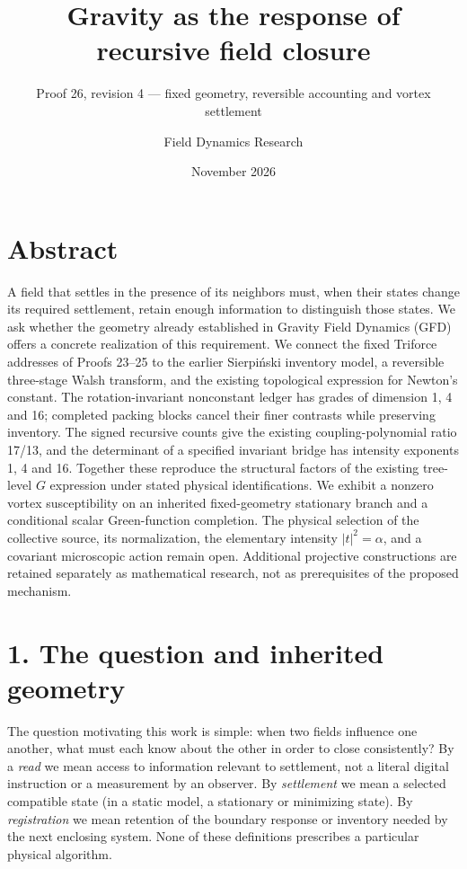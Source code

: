 \documentclass[
  11pt,
]{article}
\title{Gravity as the response of recursive field closure}
\subtitle{Proof 26, revision 4 --- fixed geometry, reversible
accounting and vortex settlement}
\author{Field Dynamics Research}
\date{November 2026}
\begin{document}
\maketitle

\section{Abstract}\label{abstract}

A field that settles in the presence of its neighbors must, when their
states change its required settlement, retain enough information to
distinguish those states. We ask whether the geometry already
established in Gravity Field Dynamics (GFD) offers a concrete
realization of this requirement. We connect the fixed Triforce addresses
of Proofs 23--25 to the earlier Sierpiński inventory model, a reversible
three-stage Walsh transform, and the existing topological expression for
Newton's constant. The rotation-invariant nonconstant ledger has grades
of dimension 1, 4 and 16; completed packing blocks cancel their finer
contrasts while preserving inventory. The signed recursive counts give
the existing coupling-polynomial ratio 17/13, and the determinant of a
specified invariant bridge has intensity exponents 1, 4 and 16. Together
these reproduce the structural factors of the existing tree-level \(G\)
expression under stated physical identifications. We exhibit a nonzero
vortex susceptibility on an inherited fixed-geometry stationary branch
and a conditional scalar Green-function completion. The physical
selection of the collective source, its normalization, the elementary
intensity \(|t|^2=\alpha\), and a covariant microscopic action remain
open. Additional projective constructions are retained separately as
mathematical research, not as prerequisites of the proposed mechanism.

\section{1. The question and inherited
geometry}\label{the-question-and-inherited-geometry}

The question motivating this work is simple: when two fields influence
one another, what must each know about the other in order to close
consistently? By a \emph{read} we mean access to information relevant to
settlement, not a literal digital instruction or a measurement by an
observer. By \emph{settlement} we mean a selected compatible state (in a
static model, a stationary or minimizing state). By \emph{registration}
we mean retention of the boundary response or inventory needed by the
next enclosing system. None of these definitions prescribes a particular
physical algorithm.
\end{document}
